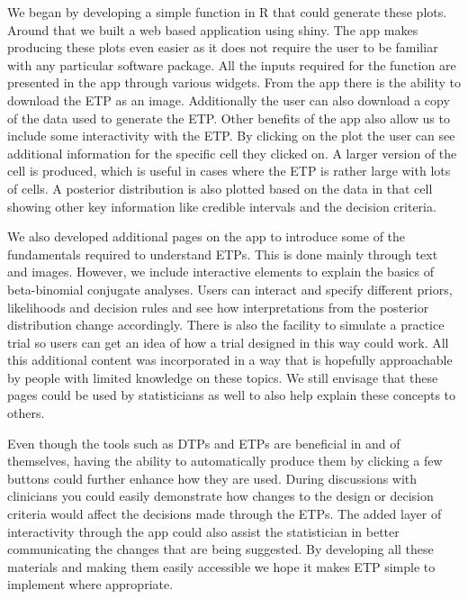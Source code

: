 We began by developing a simple function in R that could generate these plots. Around that we built a web based application using shiny. The app makes producing these plots even easier as it does not require the user to be familiar with any particular software package. All the inputs required for the function are presented in the app through various widgets. From the app there is the ability to download the ETP as an image. Additionally the user can also download a copy of the data used to generate the ETP. Other benefits of the app also allow us to include some interactivity with the ETP. By clicking on the plot the user can see additional information for the specific cell they clicked on. A larger version of the cell is produced, which is useful in cases where the ETP is rather large with lots of cells. A posterior distribution is also plotted based on the data in that cell showing other key information like credible intervals and the decision criteria.   

We also developed additional pages on the app to introduce some of the fundamentals required to understand ETPs. This is done mainly through text and images. However, we include interactive elements to explain the basics of beta-binomial conjugate analyses. Users can interact and specify different priors, likelihoods and decision rules and see how interpretations from the posterior distribution change accordingly. There is also the facility to simulate a practice trial so users can get an idea of how a trial designed in this way could work. All this additional content was incorporated in a way that is hopefully approachable by people with limited knowledge on these topics. We still envisage that these pages could be used by statisticians as well to also help explain these concepts to others. 

Even though the tools such as DTPs and ETPs are beneficial in and of themselves, having the ability to automatically produce them by clicking a few buttons could further enhance how they are used. During discussions with clinicians you could easily demonstrate how changes to the design or decision criteria would affect the decisions made through the ETPs. The added layer of interactivity through the app could also assist the statistician in better communicating the changes that are being suggested. By developing all these materials and making them easily accessible we hope it makes ETP simple to implement where appropriate.

